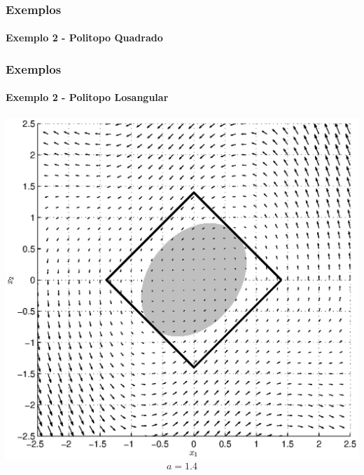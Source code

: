 \documentclass{beamer}
\begin{document}
\begin{frame}\frametitle{Exemplos}\framesubtitle{Exemplo 2 - Politopo Quadrado}
  \centering
\end{frame}

\begin{frame}\frametitle{Exemplos}\framesubtitle{Exemplo 2 - Politopo Losangular}
  \centering
  \includegraphics[height=0.7\textheight]{exemplo2_13.eps}
  \begin{equation}
    a = \num{1.4}
  \end{equation}
\end{frame}
\end{document}
